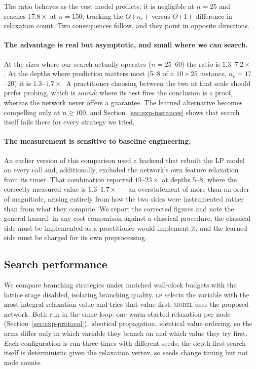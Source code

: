 \documentclass[final,5p,times,twocolumn]{elsarticle}
\begin{document}
The ratio behaves as the cost model predicts: it is negligible at $n=25$ and reaches $17.8\times$ at $n=150$, tracking the $O(n_c)$ versus $O(1)$ difference in relaxation count. Two consequences follow, and they point in opposite directions.

\paragraph{The advantage is real but asymptotic, and small where we can search.} At the sizes where our search actually operates ($n=25$--$60$) the ratio is $1.3$--$7.2\times$. At the depths where prediction matters most (5--8 of a $10\times25$ instance, $n_c=17$--$20$) it is $1.3$--$1.7\times$. A practitioner choosing between the two at that scale should prefer probing, which is \emph{sound}: where its test fires the conclusion is a proof, whereas the network never offers a guarantee. The learned alternative becomes compelling only at $n\gtrsim 100$, and Section~\ref{sec:exp-instances} shows that search itself fails there for every strategy we tried.

\paragraph{The measurement is sensitive to baseline engineering.} An earlier version of this comparison used a backend that rebuilt the LP model on every call and, additionally, excluded the network's own feature relaxation from its timer. That combination reported $19$--$23\times$ at depths 5--8, where the correctly measured value is $1.3$--$1.7\times$ --- an overstatement of more than an order of magnitude, arising entirely from how the two sides were instrumented rather than from what they compute. We report the corrected figures and note the general hazard: in any cost comparison against a classical procedure, the classical side must be implemented as a practitioner would implement it, and the learned side must be charged for its own preprocessing.

\subsection{Search performance}
\label{sec:exp-search}

We compare branching strategies under matched wall-clock budgets with the lattice stage disabled, isolating branching quality. \textsc{lp} selects the variable with the most integral relaxation value and tries that value first; \textsc{model} uses the proposed network. Both run in the same loop: one warm-started relaxation per node (Section~\ref{sec:exp-protocol}), identical propagation, identical value ordering, so the arms differ only in which variable they branch on and which value they try first. Each configuration is run three times with different seeds; the depth-first search itself is deterministic given the relaxation vertex, so seeds change timing but not node counts.
\end{document}
